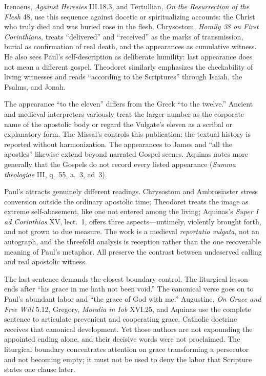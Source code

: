 Irenaeus, \emph{Against Heresies} III.18.3, and Tertullian,
\emph{On the Resurrection of the Flesh} 48, use this sequence against
docetic or spiritualizing accounts: the Christ who truly died and was buried
rose in the flesh. Chrysostom, \emph{Homily 38 on First Corinthians}, treats
``delivered'' and ``received'' as the marks of transmission, burial as
confirmation of real death, and the appearances as cumulative witness. He
also sees Paul's self-description as deliberate humility: last appearance
does not mean a different gospel. Theodoret similarly emphasizes the
checkability of living witnesses and reads ``according to the Scriptures''
through Isaiah, the Psalms, and Jonah.

The appearance ``to the eleven'' differs from the Greek ``to the twelve.''
Ancient and medieval interpreters variously treat the larger number as the
corporate name of the apostolic body or regard the Vulgate's eleven as a
scribal or explanatory form. The Missal's  controls this
publication; the textual history is reported without harmonization. The
appearances to James and ``all the apostles'' likewise extend beyond narrated
Gospel scenes. Aquinas notes more generally that the Gospels do not record
every listed appearance (\emph{Summa theologiae} III, q.~55, a.~3, ad~3).

Paul's  attracts genuinely different readings.
Chrysostom and Ambrosiaster stress conversion outside the ordinary apostolic
time; Theodoret treats the image as extreme self-abasement, like one not
entered among the living; Aquinas's \emph{Super I ad Corinthios} XV, lect.~1,
offers three aspects---untimely, violently brought forth, and not grown to due
measure. The work is a medieval \emph{reportatio vulgata}, not an autograph,
and the threefold analysis is reception rather than the one recoverable
meaning of Paul's metaphor. All preserve the contrast between undeserved
calling and real apostolic witness.

The last sentence demands the closest boundary control. The liturgical lesson
ends after ``his grace in me hath not been void.'' The canonical verse goes on
to Paul's abundant labor and ``the grace of God with me.'' Augustine,
\emph{On Grace and Free Will} 5.12, Gregory, \emph{Moralia in Iob} XVI.25,
and Aquinas use the complete sentence to articulate prevenient and cooperating
grace. Catholic doctrine receives that canonical development. Yet those
authors are not expounding the appointed ending alone, and their decisive
words were not proclaimed. The liturgical boundary concentrates attention on
grace transforming a persecutor and not becoming empty; it must not be used
to deny the labor that Scripture states one clause later.

